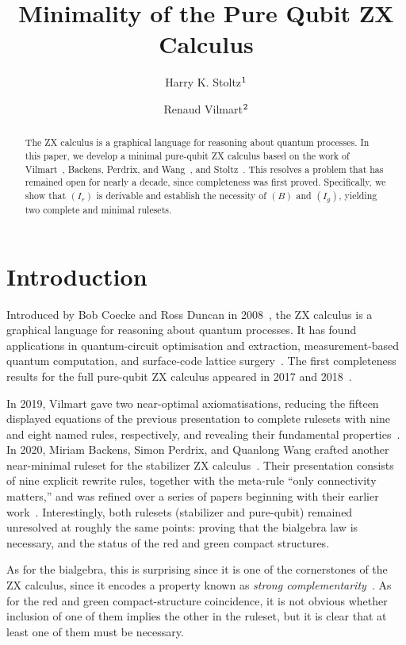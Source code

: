 \documentclass[copyright,creativecommons]{eptcs}
\title{Minimality of the Pure Qubit ZX Calculus}
\date{}
\author{
  Harry K. Stoltz$\null^{1}$ \and
  Renaud Vilmart$\null^{2}$ \and
  \institute{$\null^{1}$Courant Institute of Mathematical Sciences, New York University}
  \institute{$\null^{2}$Universit\'e de Lorraine, CNRS, Inria, LORIA, F 54000 Nancy, France}
}
\theoremstyle{definition}
\theoremstyle{remark}
\begin{document}
\maketitle

\begin{abstract}
The ZX calculus is a graphical language for reasoning about quantum processes. In this paper, we develop a minimal pure-qubit ZX calculus based on the work of Vilmart~\cite{8785765}, Backens, Perdrix, and Wang~\cite{Backens_2020}, and Stoltz~\cite{stoltz2026simplified}. This resolves a problem that has remained open for nearly a decade, since completeness was first proved. Specifically, we show that \((I_r)\) is derivable and establish the necessity of \((B)\) and \((I_g)\), yielding two complete and minimal rulesets.
\end{abstract}

\section{Introduction}
\label{sec:introduction}

Introduced by Bob Coecke and Ross Duncan in 2008~\cite{CoeckeDuncan2008,CoeckeDuncan2011}, the ZX calculus is a graphical language for reasoning about quantum processes. It has found applications in quantum-circuit optimisation and extraction, measurement-based quantum computation, and surface-code lattice surgery~\cite{DuncanEtAl2020,DuncanPerdrix2010,deBeaudrapHorsman2020}. The first completeness results for the full pure-qubit ZX calculus appeared in 2017 and 2018~\cite{NgWang2017Universal,HadzihasanovicNgWang2018,JeandelPerdrixVilmart2018Beyond}.

In 2019, Vilmart gave two near-optimal axiomatisations, reducing the fifteen displayed equations of the previous presentation to complete rulesets with nine and eight named rules, respectively, and revealing their fundamental properties~\cite{8785765}. In 2020, Miriam Backens, Simon Perdrix, and Quanlong Wang crafted another near-minimal ruleset for the stabilizer ZX calculus~\cite{Backens_2020}. Their presentation consists of nine explicit rewrite rules, together with the meta-rule ``only connectivity matters,'' and was refined over a series of papers beginning with their earlier work~\cite{Backens_2017}. Interestingly, both rulesets (stabilizer and pure-qubit) remained unresolved at roughly the same points: proving that the bialgebra law is necessary, and the status of the red and green compact structures.

As for the bialgebra, this is surprising since it is one of the cornerstones of the ZX calculus, since it encodes a property known as \emph{strong complementarity}~\cite{CoeckeDuncan2011}. As for the red and green compact-structure coincidence, it is not obvious whether inclusion of one of them implies the other in the ruleset, but it is clear that at least one of them must be necessary.
\end{document}
